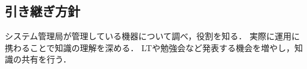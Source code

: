 \subsection*{引き継ぎ方針}


システム管理局が管理している機器について調べ，役割を知る．
実際に運用に携わることで知識の理解を深める．
LTや勉強会など発表する機会を増やし，知識の共有を行う．